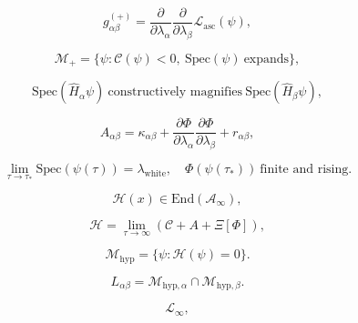 \[
g_{\alpha\beta}^{(+)} =
\frac{\partial}{\partial \lambda_\alpha}
\frac{\partial}{\partial \lambda_\beta}
\mathcal{L}_{\mathrm{asc}}(\psi),
\]

\[
\mathcal{M}_{+}
=
\{\psi : \mathcal{C}(\psi) < 0,\ \mathrm{Spec}(\psi)\ \text{expands}\},
\]

\[
\mathrm{Spec}(\hat{H}_\alpha \psi)
\ \text{constructively magnifies}\
\mathrm{Spec}(\hat{H}_\beta \psi),
\]

\[
A_{\alpha\beta}
=
\kappa_{\alpha\beta}
+
\frac{\partial \Phi}{\partial \lambda_\alpha}
\frac{\partial \Phi}{\partial \lambda_\beta}
+
r_{\alpha\beta},
\]

\[
\lim_{\tau \to \tau_*}
\mathrm{Spec}(\psi(\tau))
=
\lambda_{\mathrm{white}},
\quad
\Phi(\psi(\tau_*))\ \text{finite and rising}.
\]

\[
\mathcal{H}(x) \in \mathrm{End}(\mathcal{A}_\infty),
\]

\[
\mathcal{H}
=
\lim_{\tau \to \infty}
\left(
\mathcal{C} + A + \Xi[\Phi]
\right),
\]

\[
\mathcal{M}_{\mathrm{hyp}}
=
\{\psi : \mathcal{H}(\psi) = 0\}.
\]

\[
L_{\alpha\beta}
=
\mathcal{M}_{\mathrm{hyp},\alpha}
\cap
\mathcal{M}_{\mathrm{hyp},\beta}.
\]

\[
\mathcal{L}_\infty,
\]

